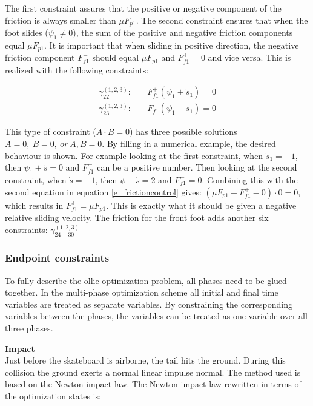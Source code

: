 \documentclass[default,iicol]{sn-jnl}
\theoremstyle{thmstyleone}%
\theoremstyle{thmstyletwo}%
\theoremstyle{thmstylethree}%
\begin{document}
The first constraint assures that the positive or negative component of the
friction is always smaller than $\mu F_{p1}$. The second constraint ensures
that when the foot slides ($\psi_1 \not = 0$),  the sum of the positive and
negative friction components equal $\mu F_{p1}$. It is important that when
sliding in positive direction, the negative friction component $F_{f1}^-$
should equal $\mu F_{p1}$ and $F_{f1}^+=0$ and vice versa. This is realized
with the following constraints:

\begin{equation}
\begin{split}
    \gamma_{22}^{(1,2,3)}: \quad & F_{f1}^+ (\psi_1 + \dot s_1)  = 0 \\
    \gamma_{23}^{(1,2,3)}: \quad & F_{f1}^- (\psi_1 - \dot s_1)  = 0
\end{split}
\end{equation}

This type of constraint ($A\cdot B = 0$) has three possible solutions $A= 0,\
B=0,\ or\ A,B = 0$. By filling in a numerical example, the desired behaviour is
shown. For example looking at the first constraint, when $\dot s_1 = -1$, then
$\psi_1 + \dot s =  0$ and $F_{f1}^+$ can be a positive number. Then looking at
the second constraint, when $\dot s = -1$, then $\psi - \dot s = 2$ and
$F_{f1}^- = 0$. Combining this with the second equation in equation
\ref{e_frictioncontrol} gives: $(\mu F_{p1} - F_{f1}^+ - 0) \cdot 0 = 0$, which
results in $F_{f1}^+ = \mu F_{p1}$. This is exactly what it should be given a
negative relative sliding velocity. The friction for the front foot adds
another six constraints: $\gamma_{24-30}^{(1,2,3)}$

\subsubsection{Endpoint constraints} \label{p_endpoints}
To fully describe the ollie optimization problem, all phases need to be glued together. In the multi-phase optimization scheme all initial and final time variables are treated as separate variables. By constraining the corresponding variables between the phases, the variables can be treated as one variable over all three phases.

\textbf{Impact}\\
Just before the skateboard is airborne, the tail hits the ground. During this collision the ground exerts a normal linear impulse normal. The method used\cite{vallery_heike_advanced_2018} is based on the Newton impact law. The Newton impact law rewritten in terms of the optimization states is:
\end{document}
